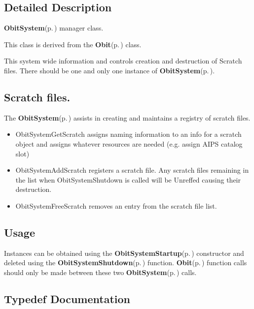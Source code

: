 \subsection{Detailed Description}
{\bf Obit\-System}{\rm (p.\,\pageref{structObitSystem})} manager class. 

This class is derived from the {\bf Obit}{\rm (p.\,\pageref{structObit})} class.

This system wide information and controls creation and destruction of Scratch files. There should be one and only one instance of {\bf Obit\-System}{\rm (p.\,\pageref{structObitSystem})}.\subsection{Scratch files.}\label{ObitSystem_8h_ObitSystemScratch}
The {\bf Obit\-System}{\rm (p.\,\pageref{structObitSystem})} assists in creating and maintains a registry of scratch files. \begin{itemize}
\item Obit\-System\-Get\-Scratch assigns naming information to an info for a scratch object and assigns whatever resources are needed (e.g. assign AIPS catalog slot) \item Obit\-System\-Add\-Scratch registers a scratch file. Any scratch files remaining in the list when Obit\-System\-Shutdown is called will be Unreffed causing their destruction. \item Obit\-System\-Free\-Scratch removes an entry from the scratch file list.\end{itemize}
\subsection{Usage}\label{ObitSystem_8h_ObitSystemUsage}
Instances can be obtained using the {\bf Obit\-System\-Startup}{\rm (p.\,\pageref{ObitSystem_8c_a14})} constructor and deleted using the {\bf Obit\-System\-Shutdown}{\rm (p.\,\pageref{ObitSystem_8c_a16})} function. {\bf Obit}{\rm (p.\,\pageref{structObit})} function calls should only be made between these two {\bf Obit\-System}{\rm (p.\,\pageref{structObitSystem})} calls.

\subsection{Typedef Documentation}
